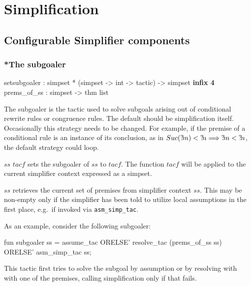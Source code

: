 
\chapter{Simplification}
\label{chap:simplification}

\section{Configurable Simplifier components}

\subsection{*The subgoaler}\label{sec:simp-subgoaler}
\begin{ttbox}
setsubgoaler :
  simpset *  (simpset -> int -> tactic) -> simpset \hfill{\bf infix 4}
prems_of_ss  : simpset -> thm list
\end{ttbox}

The subgoaler is the tactic used to solve subgoals arising out of
conditional rewrite rules or congruence rules.  The default should be
simplification itself.  Occasionally this strategy needs to be
changed.  For example, if the premise of a conditional rule is an
instance of its conclusion, as in $Suc({?\!m}) < {?\!n} \Longrightarrow {?\!m}
< {?\!n}$, the default strategy could loop.

\begin{ttdescription}
  
\item[$ss$ \ttindexbold{setsubgoaler} $tacf$] sets the subgoaler of
  $ss$ to $tacf$.  The function $tacf$ will be applied to the current
  simplifier context expressed as a simpset.
  
\item[\ttindexbold{prems_of_ss} $ss$] retrieves the current set of
  premises from simplifier context $ss$.  This may be non-empty only
  if the simplifier has been told to utilize local assumptions in the
  first place, e.g.\ if invoked via \texttt{asm_simp_tac}.

\end{ttdescription}

As an example, consider the following subgoaler:
\begin{ttbox}
fun subgoaler ss =
    assume_tac ORELSE'
    resolve_tac (prems_of_ss ss) ORELSE'
    asm_simp_tac ss;
\end{ttbox}
This tactic first tries to solve the subgoal by assumption or by
resolving with with one of the premises, calling simplification only
if that fails.



